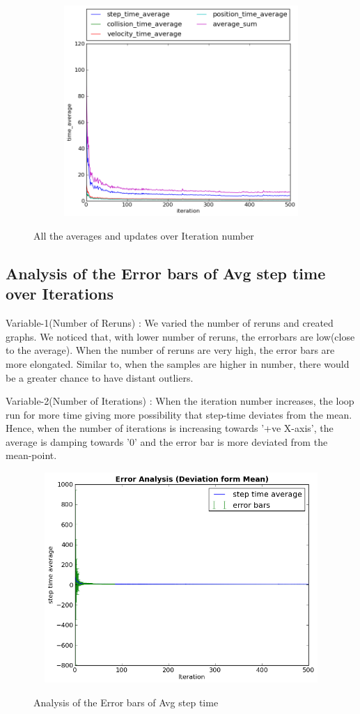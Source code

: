 \documentclass[12pt,a4paper]{report}
\begin{document}
\begin{figure}
\includegraphics[width=12cm,height=8cm]{g20_project_plot02} 
\label{fig:plt2}
\caption{All the averages and updates over Iteration number} 
\end{figure}


\subsection*{Analysis of the Error bars of Avg step time over Iterations}
\par Variable-1(Number of Reruns) : We varied the number of reruns and created graphs. We noticed that, with lower number of reruns, the errorbars are low(close to the average). When the number of reruns are very high, the error bars are more elongated. Similar to, when the samples are higher in number, there would be a greater chance to have distant outliers.

Variable-2(Number of Iterations) : When the iteration number increases, the loop run for more time giving more possibility that step-time deviates from the mean. Hence, when the number of iterations is increasing towards '+ve X-axis', the average is damping towards '0' and the error bar is more deviated from the mean-point.


\begin{figure}
\includegraphics[width=12cm,height=8cm]{g20_project_plot03} 
\label{fig:plt3}
\caption{Analysis of the Error bars of Avg step time} 
\end{figure}
\end{document}
